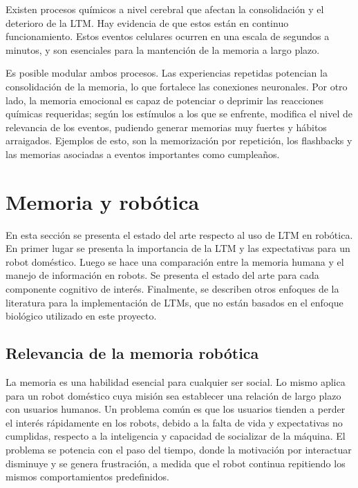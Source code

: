 Existen procesos químicos a nivel cerebral que afectan la consolidación y el deterioro de la LTM. Hay evidencia de que estos están en continuo funcionamiento. Estos eventos celulares ocurren en una escala de segundos a minutos, y son esenciales para la mantención de la memoria a largo plazo.

Es posible modular ambos procesos. Las experiencias repetidas potencian la consolidación de la memoria, lo que fortalece las conexiones neuronales. Por otro lado, la memoria emocional es capaz de potenciar o deprimir las reacciones químicas requeridas; según los estímulos a los que se enfrente, modifica el nivel de relevancia de los eventos, pudiendo generar memorias muy fuertes y hábitos arraigados. Ejemplos de esto, son la memorización por repetición, los flashbacks y las memorias asociadas a eventos importantes como cumpleaños.


\section{Memoria y robótica}

En esta sección se presenta el estado del arte respecto al uso de LTM en robótica. En primer lugar se presenta la importancia de la LTM y las expectativas para un robot doméstico. Luego se hace una comparación entre la memoria humana y el manejo de información en robots.  Se presenta el estado del arte para cada componente cognitivo de interés. Finalmente, se describen otros enfoques de la literatura para la implementación de LTMs, que no están basados en el enfoque biológico utilizado en este proyecto.


\subsection{Relevancia de la memoria robótica}

La memoria es una habilidad esencial para cualquier ser social. Lo mismo aplica para un robot doméstico cuya misión sea establecer una relación de largo plazo con usuarios humanos. Un problema común es que los usuarios tienden a perder el interés rápidamente en los robots, debido a la falta de vida y expectativas no cumplidas, respecto a la inteligencia y capacidad de socializar de la máquina. El problema se potencia con el paso del tiempo, donde la motivación por interactuar disminuye y se genera frustración, a medida que el robot continua repitiendo los mismos comportamientos predefinidos\cite{Ho2009}.

